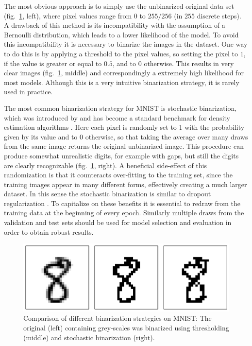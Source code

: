 The most obvious approach is to simply use the unbinarized original data set (fig.~\ref{fig:MNISTBinarizationComparison}, left), where pixel values range from $0$ to $255/256$ (in $255$ discrete steps). A drawback of this method is its incompatibility with the assumption of a Bernoulli distribution, which leads to a lower likelihood of the model.
To avoid this incompatibility it is necessary to binarize the images in the dataset. One way to do this is by applying a threshold to the pixel values, so setting the pixel to $1$, if the value is greater or equal to $0.5$, and to $0$ otherwise. This results in very clear images (fig.~\ref{fig:MNISTBinarizationComparison}, middle) and correspondingly a extremely high likelihood for most models. Although this is a very intuitive binarization strategy, it is rarely used in practice.

The most common binarization strategy for MNIST is stochastic binarization, which was introduced by \textcite{Salakhutdinov2008} and has become a standard benchmark for density estimation algorithms \parencite{Salimans2014,Rezende2014}. Here each pixel is randomly set to $1$ with the probability given by its value and to $0$ otherwise, so that taking the average over many draws from the same image returns the original unbinarized image. This procedure can produce somewhat unrealistic digits, for example with gaps, but still the digits are clearly recognizable (fig.~\ref{fig:MNISTBinarizationComparison}, right). A beneficial side-effect of this randomization is that it counteracts over-fitting to the training set, since the training images appear in many different forms, effectively creating a much larger dataset. In this sense the stochastic binarization is similar to dropout regularization \parencite{Hinton2012}. To capitalize on these benefits it is essential to redraw from the training data at the beginning of every epoch. Similarly multiple draws from the validation and test sets should be used for model selection and evaluation in order to obtain robust results. 

\begin{figure}
\centering
\includegraphics[width=\columnwidth]{figures/binarization_example.pdf}
\caption{Comparison of different binarization strategies on MNIST: The original (left) containing grey-scales was binarized using thresholding (middle) and stochastic binarization (right).}
\label{fig:MNISTBinarizationComparison}
\end{figure}

